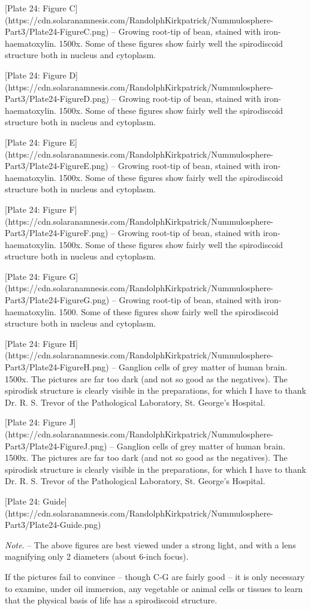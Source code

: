 \documentclass[a4paper, 12pt, oneside]{article}
\begin{document}
[Plate 24: Figure C](https://cdn.solaranamnesis.com/RandolphKirkpatrick/Nummulosphere-Part3/Plate24-FigureC.png) -- Growing root-tip of bean, stained with iron-haematoxylin. 1500x. Some of these figures show fairly well the spirodiscoid structure both in nucleus and cytoplasm.

[Plate 24: Figure D](https://cdn.solaranamnesis.com/RandolphKirkpatrick/Nummulosphere-Part3/Plate24-FigureD.png) -- Growing root-tip of bean, stained with iron-haematoxylin. 1500x. Some of these figures show fairly well the spirodiscoid structure both in nucleus and cytoplasm.

[Plate 24: Figure E](https://cdn.solaranamnesis.com/RandolphKirkpatrick/Nummulosphere-Part3/Plate24-FigureE.png) -- Growing root-tip of bean, stained with iron-haematoxylin. 1500x. Some of these figures show fairly well the spirodiscoid structure both in nucleus and cytoplasm.

[Plate 24: Figure F](https://cdn.solaranamnesis.com/RandolphKirkpatrick/Nummulosphere-Part3/Plate24-FigureF.png) -- Growing root-tip of bean, stained with iron-haematoxylin. 1500x. Some of these figures show fairly well the spirodiscoid structure both in nucleus and cytoplasm.

[Plate 24: Figure G](https://cdn.solaranamnesis.com/RandolphKirkpatrick/Nummulosphere-Part3/Plate24-FigureG.png) -- Growing root-tip of bean, stained with iron-haematoxylin. 1500. Some of these figures show fairly well the spirodiscoid structure both in nucleus and cytoplasm.

[Plate 24: Figure H](https://cdn.solaranamnesis.com/RandolphKirkpatrick/Nummulosphere-Part3/Plate24-FigureH.png) -- Ganglion cells of grey matter of human brain. 1500x. The pictures are far too dark (and not so good as the negatives). The spirodisk structure is clearly visible in the preparations, for which I have to thank Dr. R. S. Trevor of the Pathological Laboratory, St. George's Hospital.

[Plate 24: Figure J](https://cdn.solaranamnesis.com/RandolphKirkpatrick/Nummulosphere-Part3/Plate24-FigureJ.png) -- Ganglion cells of grey matter of human brain. 1500x. The pictures are far too dark (and not so good as the negatives). The spirodisk structure is clearly visible in the preparations, for which I have to thank Dr. R. S. Trevor of the Pathological Laboratory, St. George's Hospital.

[Plate 24: Guide](https://cdn.solaranamnesis.com/RandolphKirkpatrick/Nummulosphere-Part3/Plate24-Guide.png)

\emph{Note}. -- The above figures are best viewed under a strong light, and with a lens magnifying only 2 diameters (about 6-inch focus).

If the pictures fail to convince -- though C-G are fairly good -- it is only necessary to examine, under oil immersion, any vegetable or animal cells or tissues to learn that the physical basis of life has a spirodiscoid structure.
\clearpage
\end{document}
